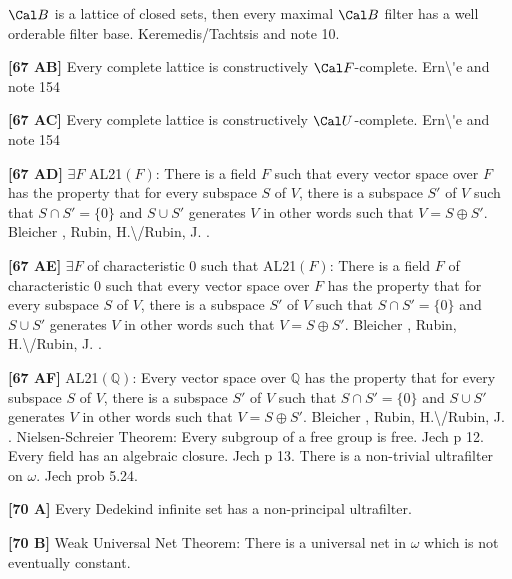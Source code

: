 $\Cal B$ is a lattice of closed sets, then every maximal $\Cal B$
filter has a well orderable filter base.  \ac{Keremedis/Tachtsis}
\cite{2000} and note 10.
\smallskip
\item{}{\bf [67 AB]} Every complete lattice is constructively
$\Cal F$-complete.  \ac{Ern\'e} \cite{2000} and note 154
\smallskip
\item{}{\bf [67 AC]} Every complete lattice is constructively $\Cal
U$-complete.  \ac{Ern\'e} \cite{2000} and note 154
\smallskip
\item{}{\bf [67 AD]} $\exists F$ AL21$(F)$: There is a field $F$ such that
every vector space over $F$ has the property that for every subspace $S$
of $V$, there is a subspace $S'$ of $V$ such that $S \cap S' = \{ 0 \}$
and $S \cup S'$ generates $V$ in other words such that $V = S \oplus S'$.
\ac{Bleicher} \cite{1964}, \ac{Rubin, H.\/Rubin, J.} \cite{1985, pp.
122,123, theorems 6.35 and 6.36}.
\smallskip
\item{}{\bf [67 AE]} $\exists F$ of characteristic $0$ such that AL21$(F)$:
There is a field $F$ of characteristic $0$ such that every vector space
over $F$ has the property that for every subspace $S$ of $V$, there is a
subspace $S'$ of $V$ such that $S \cap S' = \{ 0 \}$ and $S \cup S'$
generates $V$ in other words such that $V = S \oplus S'$. \ac{Bleicher}
\cite{1964}, \ac{Rubin, H.\/Rubin, J.} \cite{1985, pp. 122,123, theorems
6.35 and 6.36}.
\smallskip
\item{}{\bf [67 AF]} AL21$(\mathbb Q)$: Every vector space over
$\mathbb Q$ has the property that for every subspace $S$ of $V$, there is
a subspace $S'$ of $V$ such that $S \cap S' = \{ 0 \}$ and $S \cup S'$
generates $V$ in other words such that $V = S \oplus S'$. \ac{Bleicher}
\cite{1964}, \ac{Rubin, H.\/Rubin, J.} \cite{1985, pp. 122,123, theorems
6.35 and 6.36}.
\medskip
{} Nielsen-Schreier Theorem: Every subgroup of a
free group is free.  \ac{Jech} \cite{1973b} p 12.
\medskip
{}  Every field has an algebraic closure.  \ac{Jech}
\cite{1973b} p 13.
\medskip
{} There is a non-trivial ultrafilter on $\omega$.
\ac{Jech} \cite{1973b} prob 5.24.
\smallskip
\item{}{\bf [70 A]} Every Dedekind infinite set has a non-principal
ultrafilter.
\smallskip
\item{}{\bf [70 B]}  Weak Universal Net Theorem:  There is a universal
net in $\omega$ which is not eventually constant.

